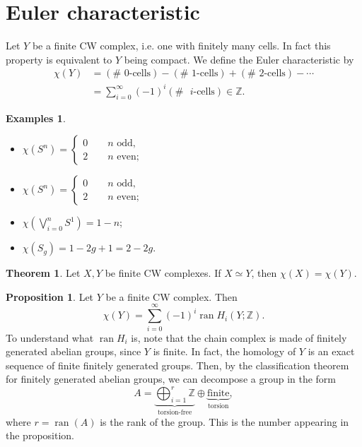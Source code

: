\documentclass{book}
\theoremstyle{definition}
\newtheorem*{teo}{Theorem}
\newtheorem*{prop}{Proposition}
\newtheorem*{ejems}{Examples}
\newcommand{\Z}{\mathbb{Z}}
\DeclareMathOperator{\ran}{ran}
\begin{document}
\section{Euler characteristic}

Let $Y$ be a finite CW complex, i.e. one with finitely many
cells. In fact this property is equivalent to $Y$ being
compact. We define the Euler characteristic by
$$
\begin{aligned}
\chi(Y)&=(\#\text{ 0-cells})-(\#\text{ 1-cells})
 +(\#\text{ 2-cells})-\cdots\\
&=\sum_{i=0}^{\infty}(-1)^i
(\#\text{ }i\text{-cells})\in\Z.
\end{aligned}
$$

\begin{ejems}\leavevmode
\begin{itemize}
\item
$\chi(S^n)=\begin{cases}
0\qquad n\text{ odd},\\
2\qquad n\text{ even};
\end{cases}$
\item
$\chi(S^n)=\begin{cases}
0\qquad n\text{ odd},\\
2\qquad n\text{ even};
\end{cases}$
\item $\chi(\bigvee_{i=0}^nS^1)=1-n$;
\item $\chi(S_g)=1-2g+1=2-2g$.
\end{itemize}
\end{ejems}

\begin{teo}
Let $X,Y$ be finite CW complexes. If $X\simeq Y$, then
$\chi(X)=\chi(Y)$.
\end{teo}

\begin{prop}
Let $Y$ be a finite CW complex. Then
$$
\chi(Y)=\sum_{i=0}^{\infty}(-1)^i\ran H_i(Y;\Z).
$$
To understand what $\ran H_i$ is, note that the chain complex
is made of finitely generated abelian groups, since $Y$ is
finite. In fact, the homology of $Y$ is an exact sequence of
finite finitely generated groups. Then, by the classification
theorem for finitely generated abelian groups, we can
decompose a group in the form
$$
A=\underbrace{\bigoplus_{i=1}^r\Z}_{\text{torsion-free}}
\oplus
\underbrace{\text{finite}}_{\text{torsion}},
$$
where $r=\ran(A)$ is the rank of the group. This is the
number appearing in the proposition.
\end{prop}
\end{document}
